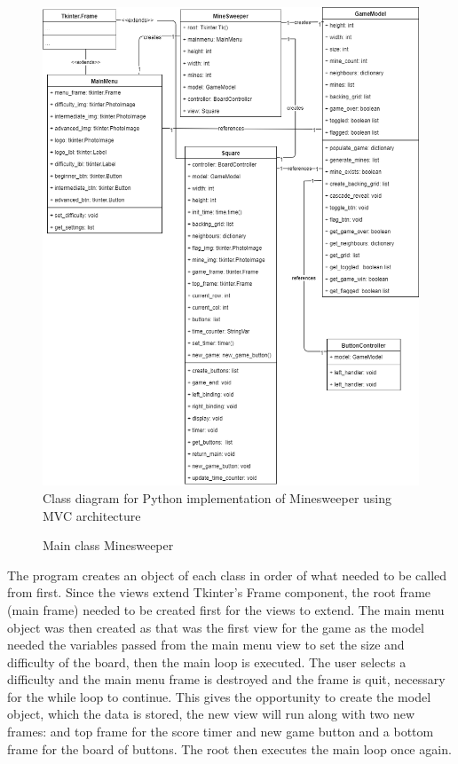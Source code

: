 \documentclass[12pt, a4]{report}
\begin{document}
	\begin{figure}[!h]
		\centering
		\includegraphics[scale=0.5]{classdiagram}
		\caption{Class diagram for Python implementation of Minesweeper using MVC architecture}
	\end{figure}
	\pagebreak
	
	\begin{figure}[!h]
		
		\caption{Main class Minesweeper}
	\end{figure}
	
	\par The program creates an object of each class in order of what needed to be called from first. Since the views extend Tkinter's Frame component, 
	the root frame (main frame) needed to be created first for the views to extend. The main menu object was then created as that was the first view 
	for the game as the model needed the variables passed from the main menu view to set the size and difficulty of the board, then the main loop is executed. 
	The user selects a difficulty and the main menu frame is destroyed and the frame is quit, necessary for the while loop to continue. This gives the 
	opportunity to create the model object, which the data is stored, the new view will run along with two new frames: and top frame for the score timer and new game button
	and a bottom frame for the board of buttons. The root then executes the main loop once again. 
	
\end{document}
